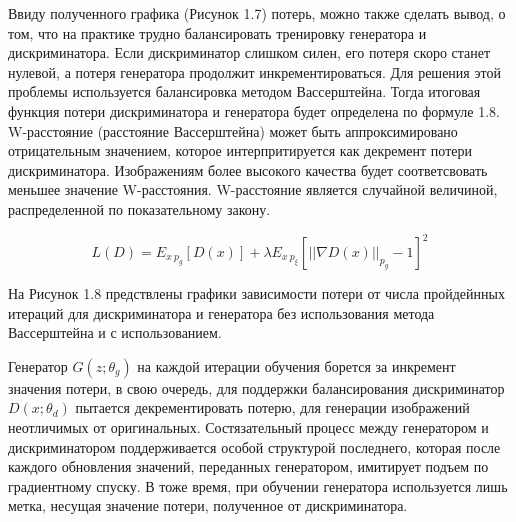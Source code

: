 Ввиду полученного графика (Рисунок 1.7) потерь, можно также сделать вывод, о том, что на практике трудно балансировать тренировку генератора и дискриминатора.  Если дискриминатор слишком силен,
его потеря скоро станет нулевой, а потеря генератора продолжит инкрементироваться. Для решения этой проблемы используется балансировка методом Вассерштейна. Тогда итоговая функция потери дискриминатора и генератора будет определена по формуле 1.8. W-расстояние (расстояние Вассерштейна) может быть аппроксимировано отрицательным значением, которое интерпритируется как декремент потери дискриминатора. Изображениям более высокого качества будет соответсвовать меньшее значение W-расстояния. W-расстояние является случайной величиной, распределенной по показательному закону. 

\begin{equation}
L(D) = E_{x~p_g}[D(x)] +  \lambda E_{x~p_\xi}[||\nabla D(x)||_{p_g} - 1] ^ 2
\end{equation}




На Рисунок 1.8 предствлены графики зависимости потери от числа пройдейнных итераций для дискриминатора и генератора без использования метода Вассерштейна и с использованием.

\begin{figure}[ht!]
\end{figure}

\newpage
Генератор $G(z; \theta_g)$ на каждой итерации обучения борется за инкремент значения потери, в свою очередь, для поддержки балансирования дискриминатор   $D(x; \theta_d)$ пытается декрементировать потерю, для генерации изображений неотличимых от оригинальных. Состязательный процесс между генератором и дискриминатором поддерживается особой структурой последнего, которая после каждого обновления значений, переданных генератором, имитирует подъем по градиентному спуску. В тоже время, при обучении генератора используется лишь метка, несущая значение потери, полученное от дискриминатора.


